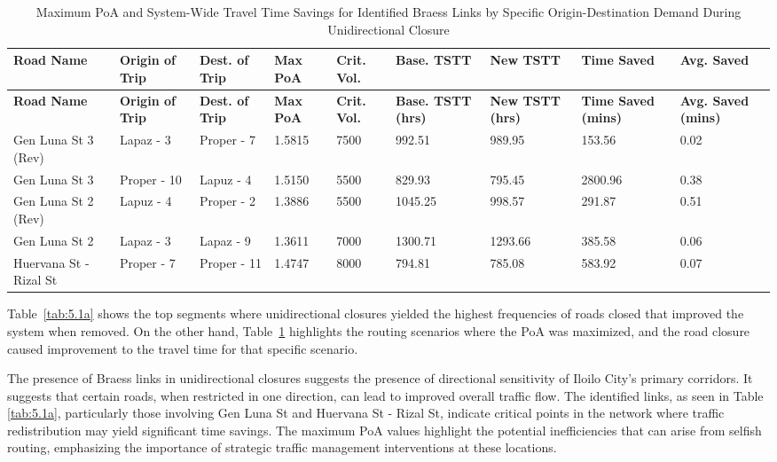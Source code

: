 {
\footnotesize
\setlength{\tabcolsep}{1.5pt}  
\renewcommand{\thetable}{5.2a}
\begin{longtable}{|p{2.5cm}|p{1.5cm}|p{1.6cm}|p{1.2cm}|p{1.4cm}|p{1.4cm}|p{1.4cm}|p{1.3cm}|p{1.3cm}|} 


    
\hline
\textbf{Road Name} & \textbf{Origin of Trip} & \textbf{Dest. of Trip} & \textbf{Max PoA} & \textbf{Crit. Vol.} & \textbf{Base. TSTT} & \textbf{New TSTT} & \textbf{Time Saved} & \textbf{Avg. Saved} \\ \hline
\endfirsthead

\hline
\textbf{Road Name} & \textbf{Origin of Trip} & \textbf{Dest. of Trip} & \textbf{Max PoA} & \textbf{Crit. Vol.} & \textbf{Base. TSTT (hrs)} & \textbf{New TSTT (hrs)} & \textbf{Time Saved (mins)} & \textbf{Avg. Saved (mins)} \\ \hline
\endhead

\hline
\endfoot

\hline
\caption{Maximum PoA and System-Wide Travel Time Savings for Identified Braess Links by Specific Origin-Destination Demand During Unidirectional Closure}
\label{tab:5.2a}
\endlastfoot

Gen Luna St 3 (Rev) & Lapaz - 3 & Proper - 7 & 1.5815 & 7500 & 992.51 & 989.95 & 153.56 & 0.02 \\ \hline
Gen Luna St 3 & Proper - 10 & Lapuz - 4 & 1.5150 & 5500 & 829.93 & 795.45 & 2800.96 & 0.38 \\ \hline
Gen Luna St 2 (Rev) & Lapuz - 4 & Proper - 2 & 1.3886 & 5500 & 1045.25 & 998.57 & 291.87 & 0.51 \\ \hline
Gen Luna St 2 & Lapaz - 3 & Lapaz - 9 & 1.3611 & 7000 & 1300.71 & 1293.66 & 385.58 & 0.06 \\ \hline
Huervana St - Rizal St & Proper - 7 & Proper - 11 & 1.4747 & 8000 & 794.81 & 785.08 & 583.92 & 0.07 \\ \hline

\end{longtable}
}

Table~\ref{tab:5.1a} shows the top segments where unidirectional closures yielded the highest frequencies of roads closed that improved the system when removed. On the other hand, Table~\ref{tab:5.2a} highlights the routing scenarios where the PoA was maximized, and the road closure caused improvement to the travel time for that specific scenario.

The presence of Braess links in unidirectional closures suggests the presence of directional sensitivity of Iloilo City's primary corridors. It suggests that certain roads, when restricted in one direction, can lead to improved overall traffic flow. The identified links, as seen in Table  \ref{tab:5.1a}, particularly those involving Gen Luna St and Huervana St - Rizal St, indicate critical points in the network where traffic redistribution may yield significant time savings. The maximum PoA values highlight the potential inefficiencies that can arise from selfish routing, emphasizing the importance of strategic traffic management interventions at these locations.

